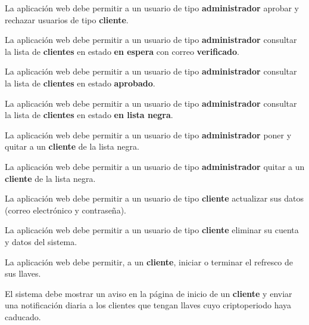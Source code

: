 {
  La aplicación web debe permitir a un usuario de tipo \textbf{administrador}
  aprobar y rechazar usuarios de tipo \textbf{cliente}.
}

{
  La aplicación web debe permitir a un usuario de tipo \textbf{administrador}
  consultar la lista de \textbf{clientes} en estado \textbf{en espera} con
  correo \textbf{verificado}.
}

{
  La aplicación web debe permitir a un usuario de tipo \textbf{administrador}
  consultar la lista de \textbf{clientes} en estado \textbf{aprobado}.
}

{
  La aplicación web debe permitir a un usuario de tipo \textbf{administrador}
  consultar la lista de \textbf{clientes} en estado \textbf{en lista negra}.
}

{
  La aplicación web debe permitir a un usuario de tipo \textbf{administrador}
  poner y quitar a un \textbf{cliente} de la lista negra.
}

{
  La aplicación web debe permitir a un usuario de tipo \textbf{administrador}
  quitar a un \textbf{cliente} de la lista negra.
}

{
  La aplicación web debe permitir a un usuario de tipo \textbf{cliente}
  actualizar sus datos (correo electrónico y contraseña).
}

{
  La aplicación web debe permitir a un usuario de tipo \textbf{cliente} eliminar
  su cuenta y datos del sistema.
}

{
  La aplicación web debe permitir, a un \textbf{cliente}, iniciar o terminar el
  refresco de sus llaves.
}

{
  El sistema debe mostrar un aviso en la página de inicio de un \textbf{cliente}
  y enviar una notificación diaria a los clientes que tengan llaves cuyo
  criptoperiodo haya caducado.
}

